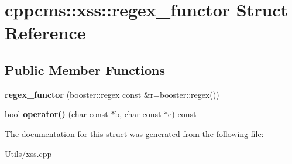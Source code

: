 \hypertarget{structcppcms_1_1xss_1_1regex__functor}{\section{cppcms\-:\-:xss\-:\-:regex\-\_\-functor Struct Reference}
\label{structcppcms_1_1xss_1_1regex__functor}
}
\subsection*{Public Member Functions}
\begin{DoxyCompactItemize}
\item 
\hypertarget{structcppcms_1_1xss_1_1regex__functor_adb26288270a29cab265df536179fbf4d}{{\bfseries regex\-\_\-functor} (booster\-::regex const \&r=booster\-::regex())}\label{structcppcms_1_1xss_1_1regex__functor_adb26288270a29cab265df536179fbf4d}

\item 
\hypertarget{structcppcms_1_1xss_1_1regex__functor_afe80dd845f7654f9d3099e08760b2ddf}{bool {\bfseries operator()} (char const $\ast$b, char const $\ast$e) const }\label{structcppcms_1_1xss_1_1regex__functor_afe80dd845f7654f9d3099e08760b2ddf}

\end{DoxyCompactItemize}


The documentation for this struct was generated from the following file\-:\begin{DoxyCompactItemize}
\item 
Utils/xss.\-cpp\end{DoxyCompactItemize}
